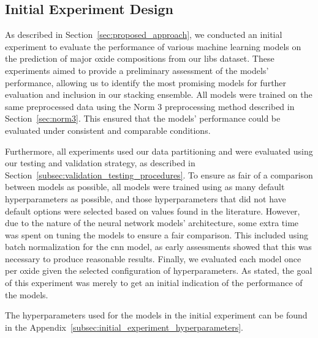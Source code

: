 \subsection{Initial Experiment Design}\label{sec:initial-experiment}
As described in Section~\ref{sec:proposed_approach}, we conducted an initial experiment to evaluate the performance of various machine learning models on the prediction of major oxide compositions from our \gls{libs} dataset.
These experiments aimed to provide a preliminary assessment of the models' performance, allowing us to identify the most promising models for further evaluation and inclusion in our stacking ensemble.
All models were trained on the same preprocessed data using the Norm 3 preprocessing method described in Section~\ref{sec:norm3}.
This ensured that the models' performance could be evaluated under consistent and comparable conditions.

Furthermore, all experiments used our data partitioning and were evaluated using our testing and validation strategy, as described in Section~\ref{subsec:validation_testing_procedures}.
To ensure as fair of a comparison between models as possible, all models were trained using as many default hyperparameters as possible, and those hyperparameters that did not have default options were selected based on values found in the literature.
However, due to the nature of the neural network models' architecture, some extra time was spent on tuning the models to ensure a fair comparison.
This included using batch normalization for the \gls{cnn} model, as early assessments showed that this was necessary to produce reasonable results.
Finally, we evaluated each model once per oxide given the selected configuration of hyperparameters.
As stated, the goal of this experiment was merely to get an initial indication of the performance of the models.

The hyperparameters used for the models in the initial experiment can be found in the Appendix~\ref{subsec:initial_experiment_hyperparameters}.
